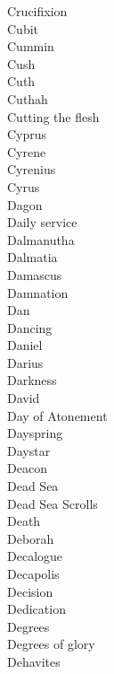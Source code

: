 Crucifixion  \\
Cubit  \\
Cummin  \\
Cush  \\
Cuth  \\
Cuthah  \\
Cutting the flesh  \\
Cyprus  \\
Cyrene  \\
Cyrenius  \\
Cyrus  \\
Dagon  \\
Daily service  \\
Dalmanutha  \\
Dalmatia  \\
Damascus  \\
Damnation  \\
Dan  \\
Dancing  \\
Daniel  \\
Darius  \\
Darkness  \\
David  \\
Day of Atonement  \\
Dayspring  \\
Daystar  \\
Deacon  \\
Dead Sea  \\
Dead Sea Scrolls  \\
Death  \\
Deborah  \\
Decalogue  \\
Decapolis  \\
Decision  \\
Dedication  \\
Degrees  \\
Degrees of glory  \\
Dehavites  \\
